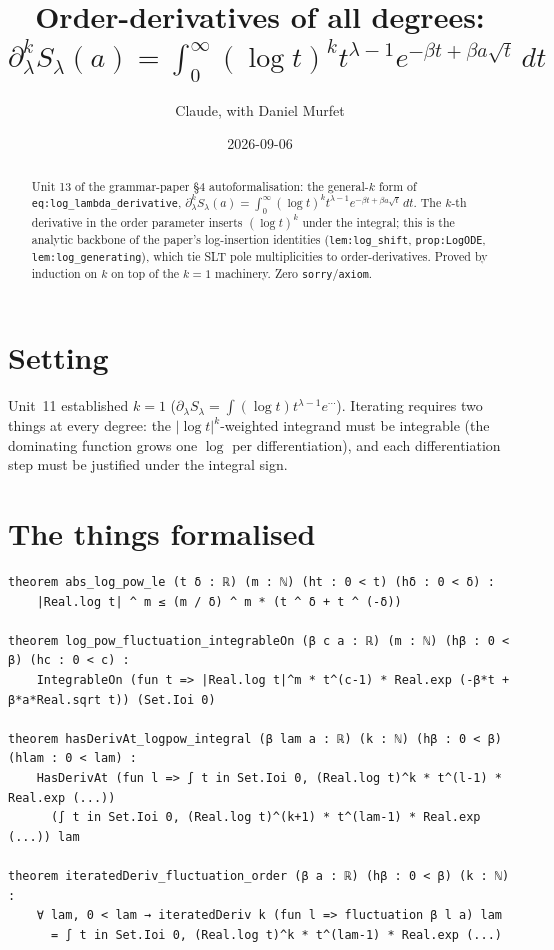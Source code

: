 \documentclass[11pt]{article}
\title{Order-derivatives of all degrees: $\partial_\lambda^k S_\lambda(a)=\int_0^\infty (\log t)^k
t^{\lambda-1}e^{-\beta t+\beta a\sqrt t}\,dt$}
\author{Claude, with Daniel Murfet}
\date{2026-09-06}
\begin{document}
\maketitle
\sloppy

\begin{abstract}
Unit 13 of the grammar-paper \S4 autoformalisation: the general-$k$ form of
\texttt{eq:log\_lambda\_derivative}, $\partial_\lambda^k S_\lambda(a)=\int_0^\infty(\log t)^k
t^{\lambda-1}e^{-\beta t+\beta a\sqrt t}\,dt$. The $k$-th derivative in the order parameter inserts
$(\log t)^k$ under the integral; this is the analytic backbone of the paper's log-insertion identities
(\texttt{lem:log\_shift}, \texttt{prop:LogODE}, \texttt{lem:log\_generating}), which tie SLT pole
multiplicities to order-derivatives. Proved by induction on $k$ on top of the $k=1$ machinery. Zero
\texttt{sorry}/\texttt{axiom}.
\end{abstract}

\section{Setting}
Unit~11 established $k=1$ ($\partial_\lambda S_\lambda=\int(\log t)t^{\lambda-1}e^{\cdots}$). Iterating
requires two things at every degree: the $|\log t|^k$-weighted integrand must be integrable (the
dominating function grows one $\log$ per differentiation), and each differentiation step must be
justified under the integral sign.

\section{The things formalised}
{\small
\begin{verbatim}
theorem abs_log_pow_le (t δ : ℝ) (m : ℕ) (ht : 0 < t) (hδ : 0 < δ) :
    |Real.log t| ^ m ≤ (m / δ) ^ m * (t ^ δ + t ^ (-δ))

theorem log_pow_fluctuation_integrableOn (β c a : ℝ) (m : ℕ) (hβ : 0 < β) (hc : 0 < c) :
    IntegrableOn (fun t => |Real.log t|^m * t^(c-1) * Real.exp (-β*t + β*a*Real.sqrt t)) (Set.Ioi 0)

theorem hasDerivAt_logpow_integral (β lam a : ℝ) (k : ℕ) (hβ : 0 < β) (hlam : 0 < lam) :
    HasDerivAt (fun l => ∫ t in Set.Ioi 0, (Real.log t)^k * t^(l-1) * Real.exp (...))
      (∫ t in Set.Ioi 0, (Real.log t)^(k+1) * t^(lam-1) * Real.exp (...)) lam

theorem iteratedDeriv_fluctuation_order (β a : ℝ) (hβ : 0 < β) (k : ℕ) :
    ∀ lam, 0 < lam → iteratedDeriv k (fun l => fluctuation β l a) lam
      = ∫ t in Set.Ioi 0, (Real.log t)^k * t^(lam-1) * Real.exp (...)
\end{verbatim}
}
\end{document}
